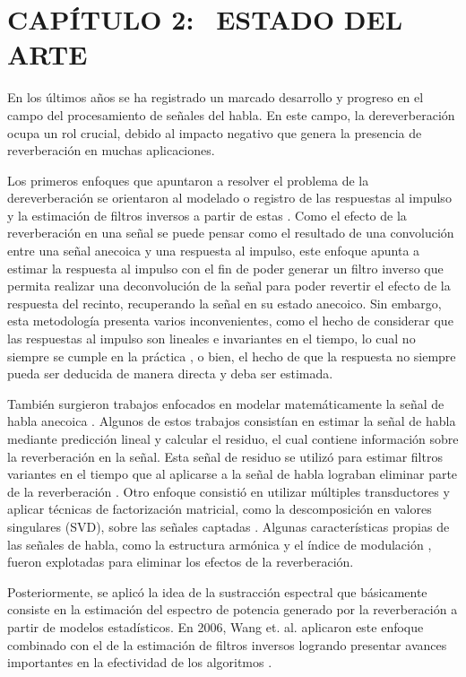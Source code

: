 \section[Estado del Arte]{CAPÍTULO 2:$\ \ \ \ $ESTADO DEL ARTE} 

En los últimos años se ha registrado un marcado desarrollo y progreso en el campo del procesamiento de señales del habla. En este campo, la dereverberación ocupa un rol crucial, debido al impacto negativo que genera la presencia de reverberación en muchas aplicaciones. 

Los primeros enfoques que apuntaron a resolver el problema de la dereverberación se orientaron al modelado o registro de las respuestas al impulso y la estimación de filtros inversos a partir de estas \cite{filtros_inv}. Como el efecto de la reverberación en una señal se puede pensar como el resultado de una convolución entre una señal anecoica y una respuesta al impulso, este enfoque apunta a estimar la respuesta al impulso con el fin de poder generar un filtro inverso que permita realizar una deconvolución de la señal para poder revertir el efecto de la respuesta del recinto, recuperando la señal en su estado anecoico. Sin embargo, esta metodología presenta varios inconvenientes, como el hecho de considerar que las respuestas al impulso son lineales e invariantes en el tiempo, lo cual no siempre se cumple en la práctica \cite{LTI}, o bien, el hecho de que la respuesta no siempre pueda ser deducida de manera directa y deba ser estimada. 


También surgieron trabajos enfocados en modelar matemáticamente la señal de habla anecoica  \cite{rabiner}. Algunos de estos trabajos consistían en estimar la señal de habla mediante predicción lineal y calcular el residuo, el cual contiene información sobre la reverberación en la señal. Esta señal de residuo se utilizó para estimar filtros variantes en el tiempo que al aplicarse a la señal de habla lograban eliminar parte de la reverberación \cite{LPresiduo}. Otro enfoque consistió en utilizar múltiples transductores y aplicar técnicas de factorización matricial, como la descomposición en valores singulares (SVD), sobre las señales captadas \cite{multichannel}. Algunas características propias de las señales de habla, como la estructura armónica \cite{armonica} y el índice de modulación  \cite{mod}, fueron explotadas para eliminar los efectos de la reverberación. 

Posteriormente, se aplicó la idea de la sustracción espectral \cite{spect_subtrac} \cite{spect_subtrac2} que básicamente consiste en la estimación del espectro de potencia generado por la reverberación a partir de modelos estadísticos. En 2006, Wang et. al. aplicaron este enfoque combinado con el de la estimación de filtros inversos logrando presentar avances importantes en la efectividad de los algoritmos \cite{two_stage}.
 
